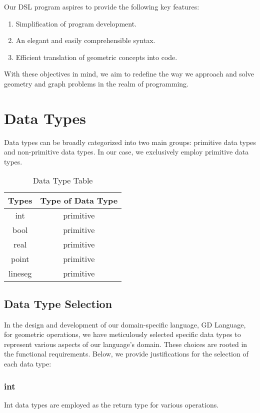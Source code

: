 \documentclass{article}
\begin{document}
Our DSL program aspires to provide the following key features:

\begin{enumerate}
  \item Simplification of program development.
  \item An elegant and easily comprehensible syntax.
  \item Efficient translation of geometric concepts into code.
\end{enumerate}

With these objectives in mind, we aim to redefine the way we approach and solve geometry and graph problems in the realm of programming.

\section{Data Types}

Data types can be broadly categorized into two main groups: primitive data types and non-primitive data types. In our case, we exclusively employ primitive data types.

\begin{table}[h]
\centering
\caption{Data Type Table}
\label{tab:Datatypes}
\begin{tabular}{cc}
\toprule
\textbf{Types} & \textbf{Type of Data Type} \\
\midrule
int & primitive \\
bool & primitive \\
real & primitive \\
point & primitive \\
lineseg & primitive \\
\bottomrule
\end{tabular}
\end{table}

\subsection{Data Type Selection}

In the design and development of our domain-specific language, GD Language, for geometric operations, we have meticulously selected specific data types to represent various aspects of our language's domain. These choices are rooted in the functional requirements. Below, we provide justifications for the selection of each data type:

\subsubsection{int}
\begin{description}[leftmargin=1cm]
  \item[Usage:] Int data types are employed as the return type for various operations.
\end{description}
\end{document}
